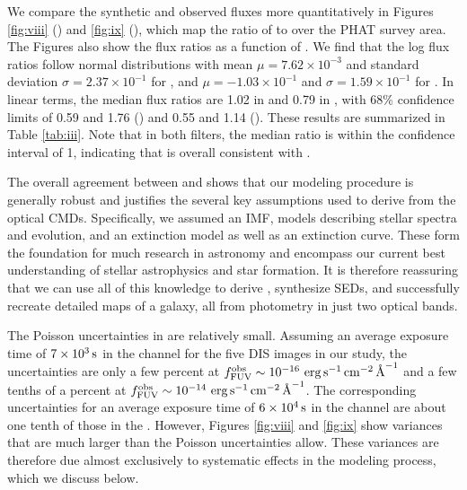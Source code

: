 \documentclass[iop, tighten]{emulateapj}
\begin{document}
We compare the synthetic and observed fluxes more quantitatively in Figures
\ref{fig:viii} (\fuv{}) and \ref{fig:ix} (\nuv{}), which map the ratio of
\fxsfh{} to \fxobs{} over the PHAT survey area. The Figures also show the flux
ratios as a function of \fxobs{}. We find that the log flux ratios follow normal
distributions with mean $\mu = 7.62\times 10^{-3}$ and standard deviation
$\sigma = 2.37\times 10^{-1}$ for \fuv{}, and $\mu = -1.03\times 10^{-1}$ and
$\sigma = 1.59\times 10^{-1}$ for \nuv{}. In linear terms, the median flux
ratios are 1.02 in \fuv{} and 0.79 in \nuv{}, with 68\% confidence limits of
0.59 and 1.76 (\fuv{}) and 0.55 and 1.14 (\nuv{}). These results are summarized
in Table \ref{tab:iii}. Note that in both filters, the median ratio is within
the confidence interval of 1, indicating that \fxsfh{} is overall consistent
with \fxobs{}.

\figviii

\figix

The overall agreement between \fxsfh{} and \fxobs{} shows that our modeling
procedure is generally robust and justifies the several key assumptions used to
derive \fxsfh{} from the optical CMDs. Specifically, we assumed an IMF, models
describing stellar spectra and evolution, and an extinction model as well as an
extinction curve. These form the foundation for much research in astronomy and
encompass our current best understanding of stellar astrophysics and star
formation. It is therefore reassuring that we can use all of this knowledge to
derive , synthesize SEDs, and successfully recreate detailed maps of a
galaxy, all from photometry in just two optical bands.

The Poisson uncertainties in \fxobs{} are relatively small. Assuming an average
exposure time of $7\times 10^3\,\mathrm{s}$ in the \fuv{} channel for the five DIS
images in our study, the uncertainties are only a few percent at $f_{\mathrm{FUV}}^{\mathrm{obs}} \sim
10^{-16}\, \,\mathrm{erg}\,\mathrm{s}^{-1}\,\mathrm{cm}^{-2}\,\textrm{\AA}^{-1}$ and a few tenths of a percent at $f_{\mathrm{FUV}}^{\mathrm{obs}} \sim
10^{-14}\, \,\mathrm{erg}\,\mathrm{s}^{-1}\,\mathrm{cm}^{-2}\,\textrm{\AA}^{-1}$. The corresponding \nuv{} uncertainties for an average
exposure time of $6\times 10^4\,\mathrm{s}$ in the \nuv{} channel are about one tenth
of those in the \fuv{}. However, Figures \ref{fig:viii} and \ref{fig:ix} show
variances that are much larger than the Poisson uncertainties allow. These
variances are therefore due almost exclusively to systematic effects in the
modeling process, which we discuss below.
\end{document}
